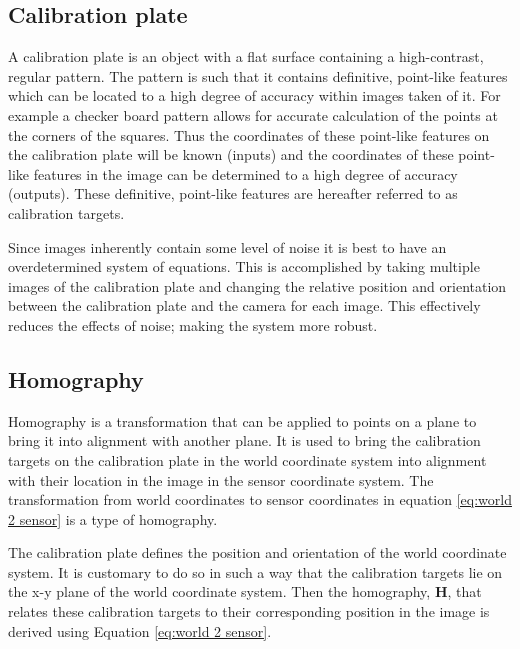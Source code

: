 \documentclass[12pt,oneside,openany,a4paper, %
english, %
masters-t, goldenblock]{usthesis}
\begin{document}
\subsection{Calibration plate}
A calibration plate is an object with a flat surface containing a high-contrast, regular pattern. The pattern is such that it contains definitive, point-like features which can be located to a high degree of accuracy within images taken of it. For example a checker board pattern allows for accurate calculation of the points at the corners of the squares. Thus the coordinates of these point-like features on the calibration plate will be known (inputs) and the coordinates of these point-like features in the image can be determined to a high degree of accuracy (outputs). These definitive, point-like features are hereafter referred to as calibration targets.

Since images inherently contain some level of noise it is best to have an overdetermined system of equations. This is accomplished by taking multiple images of the calibration plate and changing the relative position and orientation between the calibration plate and the camera for each image. This effectively reduces the effects of noise; making the system more robust.

\subsection{Homography}
\label{sec: homography}
Homography is a transformation that can be applied to points on a plane to bring it into alignment with another plane. It is used to bring the calibration targets on the calibration plate in the world coordinate system into alignment with their location in the image in the sensor coordinate system. The transformation from world coordinates to sensor coordinates in equation \ref{eq:world 2 sensor} is a type of homography.

The calibration plate defines the position and orientation of the world coordinate system. It is customary to do so in such a way that the calibration targets lie on the x-y plane of the world coordinate system. Then the homography, $\bm{H}$, that relates these calibration targets to their corresponding position in the image is derived using Equation \ref{eq:world 2 sensor}.
\end{document}

